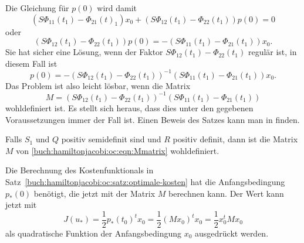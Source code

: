 Die Gleichung für $p(0)$ wird damit
\[
(S\Phi_{11}(t_1)
-\Phi_{21}(t)_1)x_0
+
(S\Phi_{12}(t_1)
-\Phi_{22}(t_1))p(0)
=
0
\]
oder
\[
(S\Phi_{12}(t_1)
-\Phi_{22}(t_1))
p(0)
=
-
(S\Phi_{11}(t_1)
-\Phi_{21}(t_1))
x_0.
\]
Sie hat sicher eine Lösung, wenn der Faktor $S\Phi_{12}(t_1)-\Phi_{22}(t_1)$
regulär ist, in diesem Fall ist
\[
p(0)
=
-
(S\Phi_{12}(t_1)
-\Phi_{22}(t_1))^{-1}
(S\Phi_{11}(t_1)
-\Phi_{21}(t_1))
x_0.
\]
Das Problem ist also leicht lösbar, wenn die Matrix
\begin{equation}
M
=
(S\Phi_{12}(t_1)
-\Phi_{22}(t_1))^{-1}
(S\Phi_{11}(t_1)
-\Phi_{21}(t_1))
\label{buch:hamiltonjacobi:oc:eqn:Mmatrix}
\end{equation}
wohldefiniert ist.
Es stellt sich heraus, dass dies unter den gegebenen Voraussetzungen
immer der Fall ist.
Einen Beweis des Satzes kann man in \cite[chapter 4]{buch:control} finden.

\begin{satz}
Falls $S_1$ und $Q$ positiv semidefinit sind und $R$ positiv definit,
dann ist die Matrix $M$ von
\eqref{buch:hamiltonjacobi:oc:eqn:Mmatrix}
wohldefiniert.
\end{satz}


Die Berechnung des Kostenfunktionals in
Satz~\ref{buch:hamiltonjacobi:oc:satz:optimale-kosten}
hat die Anfangsbedingung $p_*(0)$ benötigt, die jetzt mit der
Matrix $M$ berechnen kann.
Der Wert kann jetzt mit
\[
J(u_*)
=
\frac12 p_*(t_0)^t x_0
=
\frac12 (Mx_0)^t x_0
=
\frac12 x_0^t Mx_0
\]
als quadratische Funktion der Anfangsbedingung $x_0$ ausgedrückt werden.



